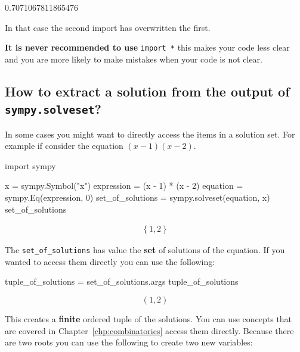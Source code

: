 \begin{raw}
0.7071067811865476
\end{raw}





In that case the second import has overwritten the first.

\begin{note}
\textbf{It is never recommended to use} \texttt{import *} this makes your code less clear
and you are more likely to make mistakes when your code is not clear.
\end{note}


\subsection{How to extract a solution from the output of \texttt{sympy.solveset}?}

In some cases you might want to directly access the items in a solution set. For
example if consider the equation \((x - 1)(x -
2)\).

\begin{pyin}
import sympy

x = sympy.Symbol("x")
expression = (x - 1) * (x - 2)
equation = sympy.Eq(expression, 0)
set_of_solutions = sympy.solveset(equation, x)
set_of_solutions
\end{pyin}




\begin{equation*}
\begin{split}\displaystyle \left\{1, 2\right\}\end{split}
\end{equation*}




The \texttt{set\_of\_solutions} has value the \textbf{set} of solutions of the
equation. If you
wanted to access them directly you can use the following:




\begin{pyin}
tuple_of_solutions = set_of_solutions.args
tuple_of_solutions
\end{pyin}





\[
(1, 2)
\]

This creates a \textbf{finite} ordered tuple of the solutions. You can use concepts
that are covered in Chapter~\ref{chp:combinatorics}
access them directly. Because there are two roots you can use the following to
create two new variables:

